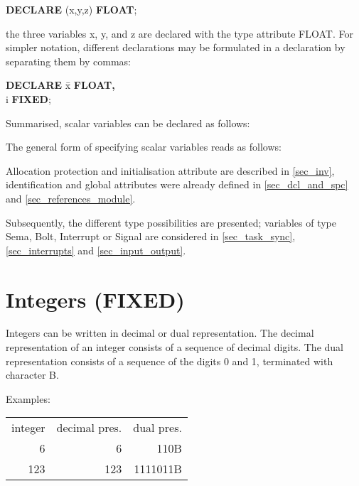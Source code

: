 {\bf DECLARE} (x,y,z) {\bf FLOAT};

the three variables x, y, and z are declared with the type attribute
FLOAT.  For simpler notation, different declarations may be formulated
in a declaration by separating them by commas:

\begin{tabbing}
{\bf DECLARE} \= x {\bf FLOAT,}\\
              \> i {\bf FIXED};
\end{tabbing}

Summarised, scalar variables can be declared as follows:










The general form of specifying scalar variables reads as follows:





Allocation protection and initialisation attribute are described in 
\ref{sec_inv},
identification and global attributes were already defined
in \ref{sec_dcl_and_spc} and \ref{sec_references_module}.

Subsequently, the different type possibilities are presented; variables
of type Sema, Bolt, Interrupt or Signal are considered in 
\ref{sec_task_sync}, \ref{sec_interrupts} and
\ref{sec_input_output}.

\section{Integers (FIXED)}   %

Integers can be written in decimal or dual representation. The decimal
representation of an integer consists of a sequence of decimal digits. The dual
representation consists of a sequence of the digits 0 and 1, terminated
with character B.

Examples:

\begin{tabular}{rrr}
integer & decimal pres. & dual pres. \\
      6 &             6 &     110B \\
    123 &           123 & 1111011B
\end{tabular}

